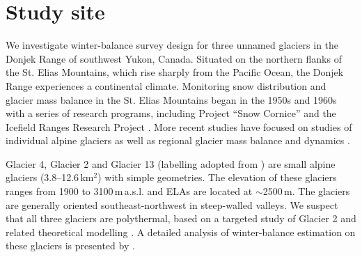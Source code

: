 \documentclass[twocolumn,letterpaper]{igs}
\begin{document}

\section{Study site}

We investigate winter-balance survey design for three unnamed glaciers in the Donjek Range of southwest Yukon, Canada. Situated on the northern flanks of the St. Elias Mountains, which rise sharply from the Pacific Ocean, the Donjek Range experiences a continental climate. Monitoring snow distribution and glacier mass balance in the St. Elias Mountains began in the 1950s and 1960s with a series of research programs, including Project ``Snow Cornice''  and the Icefield Ranges Research Project \citep{Wood1948, Danby2003}. More recent studies have focused on studies of individual alpine glaciers \citep[e.g.][]{Clarke2014,Flowers2014} as well as regional glacier mass balance and dynamics \citep[e.g.][]{Arendt2008, Burgess2013,Waechter2015}. 

Glacier 4, Glacier 2 and Glacier 13 (labelling adopted from \cite{Crompton2016}) are small alpine glaciers (3.8--12.6\,km$^2$) with simple geometries. The elevation of these glaciers ranges from 1900 to 3100\,m\,a.s.l. and ELAs are located at $\sim$2500\,m. The glaciers are generally oriented southeast-northwest in steep-walled valleys. We suspect that all three glaciers are polythermal, based on a targeted study of Glacier 2 \citep{Wilson2013} and related theoretical modelling \citep{Wilson2013a}. A detailed analysis of winter-balance estimation on these glaciers is presented by \cite{Pulwicki2017}.
\end{document}
